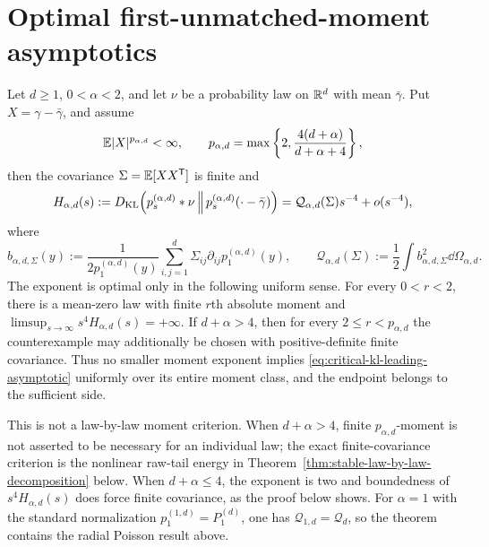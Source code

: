 \section{Optimal first-unmatched-moment asymptotics}

\begin{theorem}
\label{thm:high-dimensional-kl-moment-threshold}
Let \(d\ge1\), \(0<\alpha<2\), and let \(\nu\) be a probability law on
\(\mathbb{R}^d\) with mean \(\bar\gamma\).  Put
\(X=\gamma-\bar\gamma\), and assume
\begin{equation}\label{eq:critical-kl-moment-hypothesis}
 \mathbb{E}|X|^{p_{\alpha,d}}<\infty,
 \qquad
 p_{\alpha,d}=\max\left\{2,
 \frac{4(d+\alpha)}{d+\alpha+4}\right\},
\end{equation}
then the covariance \(\Sigma=\mathbb{E}[XX^{\mathsf T}]\) is finite and
\begin{equation}\label{eq:critical-kl-leading-asymptotic}
 H_{\alpha,d}(s):=
 D_{\rm KL}\!\left(p_s^{(\alpha,d)}*\nu\,\middle\|\,
 p_s^{(\alpha,d)}(\mathord\cdot-\bar\gamma)\right)
 =\mathcal Q_{\alpha,d}(\Sigma)s^{-4}+o(s^{-4}),
\end{equation}
where
\begin{equation}\label{eq:stable-leading-covariance-functional}
 b_{\alpha,d,\Sigma}(y)
 :=\frac1{2p_1^{(\alpha,d)}(y)}
   \sum_{i,j=1}^d\Sigma_{ij}\partial_{ij}p_1^{(\alpha,d)}(y),
 \qquad
 \mathcal Q_{\alpha,d}(\Sigma)
 :=\frac12\int b_{\alpha,d,\Sigma}^2\dd\Omega_{\alpha,d}.
\end{equation}
The exponent is optimal only in the following uniform sense.  For every
\(0<r<2\), there is a mean-zero law with finite \(r\)th absolute moment
and \(\limsup_{s\to\infty}s^4H_{\alpha,d}(s)=+\infty\).  If
\(d+\alpha>4\), then for every \(2\le r<p_{\alpha,d}\) the counterexample
may additionally be chosen with positive-definite finite covariance.
Thus no smaller moment exponent implies
\eqref{eq:critical-kl-leading-asymptotic} uniformly over its entire moment
class, and the endpoint belongs to the sufficient side.

This is not a law-by-law moment criterion.  When \(d+\alpha>4\), finite
\(p_{\alpha,d}\)-moment is not asserted to be necessary for an individual
law; the exact finite-covariance criterion is the nonlinear raw-tail energy
in Theorem~\ref{thm:stable-law-by-law-decomposition} below.  When
\(d+\alpha\le4\), the exponent is two and boundedness of
\(s^4H_{\alpha,d}(s)\) does force finite covariance, as the proof below
shows.  For \(\alpha=1\) with the standard normalization
\(p_1^{(1,d)}=P_1^{(d)}\), one has
\(\mathcal Q_{1,d}=\mathcal Q_d\), so the theorem contains the radial
Poisson result above.
\end{theorem}


